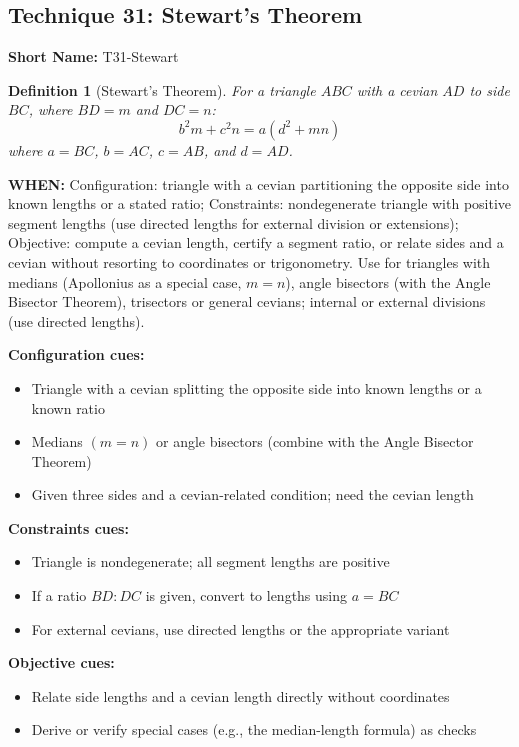 \documentclass[12pt]{article}
\newtheorem{definition}{Definition}[section]
\begin{document}
\subsection{Technique 31: Stewart's Theorem}
\textbf{Short Name:} T31-Stewart

\begin{definition}[Stewart's Theorem]
For a triangle $ABC$ with a cevian $AD$ to side $BC$, where $BD = m$ and $DC = n$:
$$b^2m + c^2n = a(d^2 + mn)$$
where $a = BC$, $b = AC$, $c = AB$, and $d = AD$.
\end{definition}

\textbf{WHEN:} Configuration: triangle with a cevian partitioning the opposite side into known lengths or a stated ratio; Constraints: nondegenerate triangle with positive segment lengths (use directed lengths for external division or extensions); Objective: compute a cevian length, certify a segment ratio, or relate sides and a cevian without resorting to coordinates or trigonometry. Use for triangles with medians (Apollonius as a special case, \(m=n\)), angle bisectors (with the Angle Bisector Theorem), trisectors or general cevians; internal or external divisions (use directed lengths).

\textbf{Configuration cues:}
\begin{itemize}
    \item Triangle with a cevian splitting the opposite side into known lengths or a known ratio
    \item Medians \((m=n)\) or angle bisectors (combine with the Angle Bisector Theorem)
    \item Given three sides and a cevian-related condition; need the cevian length
\end{itemize}

\textbf{Constraints cues:}
\begin{itemize}
    \item Triangle is nondegenerate; all segment lengths are positive
    \item If a ratio \(BD:DC\) is given, convert to lengths using \(a=BC\)
    \item For external cevians, use directed lengths or the appropriate variant
\end{itemize}

\textbf{Objective cues:}
\begin{itemize}
    \item Relate side lengths and a cevian length directly without coordinates
    \item Derive or verify special cases (e.g., the median-length formula) as checks
\end{itemize}
\end{document}
